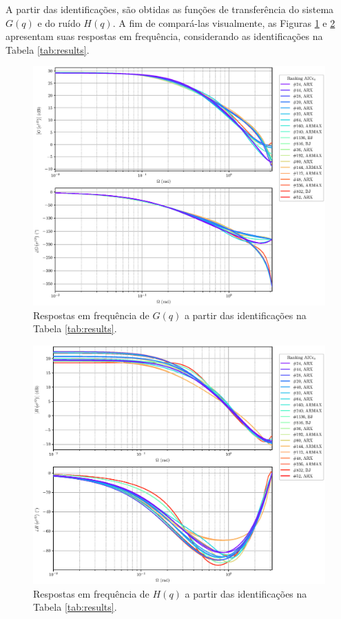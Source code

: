 \documentclass{ppgeesa}
\begin{document}
A partir das identificações, são obtidas as funções de transferência do sistema $G(q)$ e do ruído $H(q)$.
A fim de compará-las visualmente, as Figuras \ref{fig:bode-system} e \ref{fig:bode-noise} apresentam suas respostas em frequência, considerando as identificações na Tabela \ref{tab:results}.

\begin{figure}[!htbp]
  \centering
  \includegraphics[width=\linewidth]{bode_G_AICCv}
  \caption{Respostas em frequência de $G(q)$ a partir das identificações na Tabela \ref{tab:results}.}
  \label{fig:bode-system}
\end{figure}

\begin{figure}[!htbp]
  \centering
  \includegraphics[width=\linewidth]{bode_H_AICCv}
  \caption{Respostas em frequência de $H(q)$ a partir das identificações na Tabela \ref{tab:results}.}
  \label{fig:bode-noise}
\end{figure}
\end{document}
